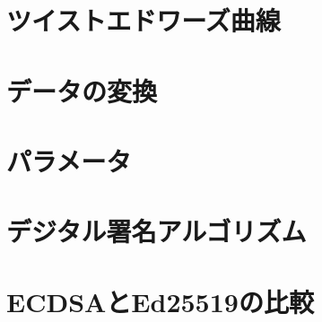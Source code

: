 \section{ツイストエドワーズ曲線}

\section{データの変換}

\newpage
\section{パラメータ}

\section{デジタル署名アルゴリズム}

\section{ECDSAとEd25519の比較}
